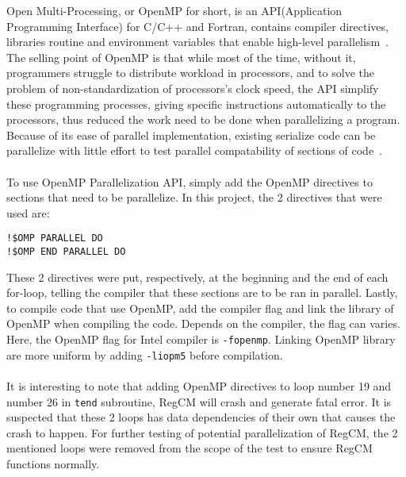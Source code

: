 Open Multi-Processing, or OpenMP for short, is an API(Application Programming Interface) for C/C++ and Fortran, contains compiler directives, libraries routine and environment variables that enable high-level parallelism~\cite{ompfaq}. The selling point of OpenMP is that while most of the time, without it, programmers struggle to distribute workload in processors, and to solve the problem of non-standardization of processors's clock speed, the API simplify these programming processes, giving specific instructions automatically to the processors, thus reduced the work need to be done when parallelizing a program. Because of its ease of parallel implementation, existing serialize code can be parallelize with little effort to test parallel compatability of sections of code~\cite{omp_intro}. \\
~\\
To use OpenMP Parallelization API, simply add the OpenMP directives to sections that need to be parallelize. In this project, the 2 directives that were used are: 
\begin{center}
\begin{BVerbatim}
!$OMP PARALLEL DO
!$OMP END PARALLEL DO
\end{BVerbatim}
\end{center}
These 2 directives were put, respectively, at the beginning and the end of each for-loop, telling the compiler that these sections are to be ran in parallel. Lastly, to compile code that use OpenMP, add the compiler flag and link the library of OpenMP when compiling the code. Depends on the compiler, the flag can varies. Here, the OpenMP flag for Intel compiler is \verb|-fopenmp|. Linking OpenMP library are more uniform by adding \verb|-liopm5| before compilation. \\
~\\
It is interesting to note that adding OpenMP directives to loop number 19 and number 26 in \verb|tend| subroutine, RegCM will crash and generate fatal error. It is suspected that these 2 loops has data dependencies of their own that causes the crash to happen. For further testing of potential parallelization of RegCM, the 2 mentioned loops were removed from the scope of the test to ensure RegCM functions normally. 